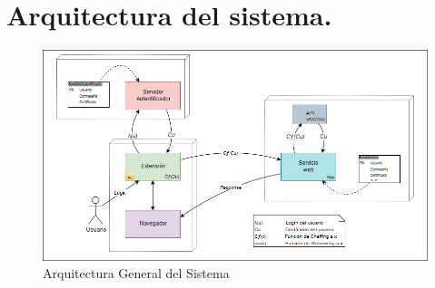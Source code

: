 \documentclass[12pt, a4paper, titlepage]{report}
\begin{document}
    	\section{Arquitectura del sistema.}
            \begin{figure}[H]
        		\begin{center}
        		\includegraphics[width=15cm]{./imagenes/Analisis/ArquitecturaSistema.png}
        		\caption{Arquitectura General del Sistema}
	            \end{center}
	        \end{figure}    
\end{document}
